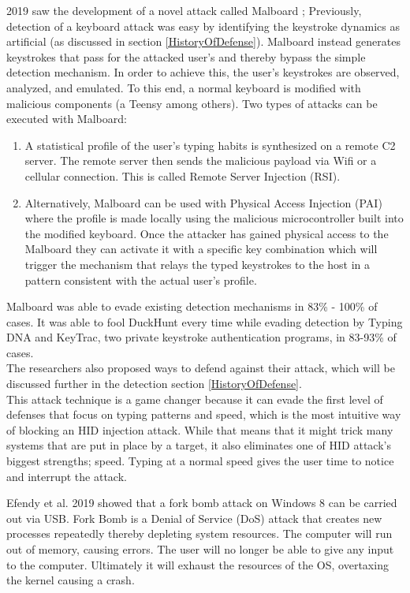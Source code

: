 \label{malboard}2019 saw the development of a novel attack called Malboard \cite{farhiMalboardNovelUser2019}; Previously, detection of a keyboard attack was easy by identifying the keystroke dynamics as artificial (as discussed in section \ref{HistoryOfDefense}). Malboard instead generates keystrokes that pass for the attacked user's and thereby bypass the simple detection mechanism. In order to achieve this, the user's keystrokes are observed, analyzed, and emulated. To this end, a normal keyboard is modified with malicious components (a Teensy among others).  Two types of attacks can be executed with Malboard: 
\begin{enumerate}
    \item A statistical profile of the user's typing habits is synthesized on a remote C2 server. The remote server then sends the malicious payload via Wifi or a cellular connection. This is called Remote Server Injection (RSI). 
    \item Alternatively, Malboard can be used with Physical Access Injection (PAI) where the profile is made locally using the malicious microcontroller built into the modified keyboard. Once the attacker has gained physical access to the Malboard they can activate it with a specific key combination which will trigger the mechanism that relays the typed keystrokes to the host in a pattern consistent with the actual user's profile.
 \end{enumerate}
 Malboard was able to evade existing detection mechanisms in 83\% - 100\% of cases. It was able to fool DuckHunt every time while evading detection by Typing DNA and KeyTrac, two private keystroke authentication programs, in 83-93\% of cases. \\
 The researchers also proposed ways to defend against their attack, which will be discussed further in the detection section \ref{HistoryOfDefense}. \\
 This attack technique is a game changer because it can evade the first level of defenses that focus on typing patterns and speed, which is the most intuitive way of blocking an HID injection attack. While that means that it might trick many systems that are put in place by a target, it also eliminates one of HID attack's biggest strengths; speed. Typing at a normal speed gives the user time to notice and interrupt the attack.  


Efendy et al. 2019 \cite{efendyExploringPossibilityUSB2019} showed that a fork bomb attack on Windows 8 can be carried out via USB. Fork Bomb is a Denial of Service (DoS) attack that creates new processes repeatedly thereby depleting system resources. The computer will run out of memory, causing errors. The user will no longer be able to give any input to the computer. Ultimately it will exhaust the resources of the OS, overtaxing the kernel causing a crash.  

